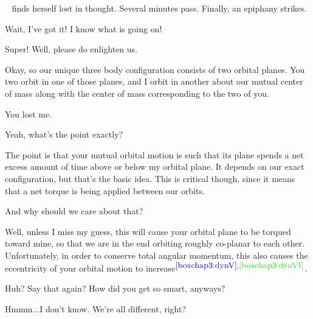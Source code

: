 \documentclass[main.tex]{subfiles}
\begin{document}
\par \nar \rmcelaeno~ finds herself lost in thought.  Several minutes pass.  Finally, an epiphany strikes.

\par \Celaeno  Wait, I've got it!  I know what is going on!

\par \Taygete  Super!  Well, please do enlighten us.

\par \Celaeno  Okay, so our unique three body configuration consists of two orbital planes.  You two orbit in one of those planes, and I orbit in another about our mutual center of mass along with the center of mass corresponding to the two of you.

\par \Alcyone  You lost me.

\par \Taygete Yeah, what's the point exactly?

\par \Celaeno The point is that your mutual orbital motion is such that its plane spends a net excess amount of time above or below my orbital plane.  It depends on our exact configuration, but that's the basic idea.  This is critical though, since it means that a net torque is being applied between our orbits.




\par \Alcyone And why should we care about that?

\par \Celaeno Well, unless I miss my guess, this will cause your orbital plane to be torqued toward mine, so that we are in the end orbiting roughly co-planar to each other.  Unfortunately, in order to conserve total angular momentum, this also causes the eccentricity of your orbital motion to increase$^{\textcolor{blue}{\ref{boxchap3:dynV}},\textcolor{green}{\ref{boxchap3:dynVI}}}$.  

\par \Taygete  Huh?  Say that again?  How did you get so smart, anyways?

\par \Celaeno Hmmm...I don't know.  We're all different, right? 
\end{document}
